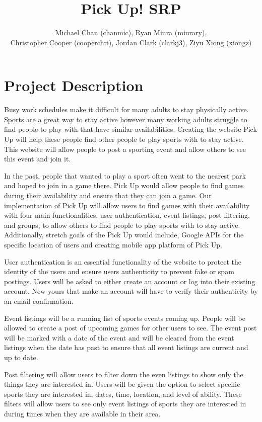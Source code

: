 \documentclass[a4paper]{article}
\title{Pick Up! SRP}
\author{Michael Chan (chanmic), Ryan Miura (miurary), \\Christopher Cooper (cooperchri), Jordan Clark (clarkj3), Ziyu Xiong (xiongz)}
\begin{document}
\maketitle

\section{Project Description}
Busy work schedules make it difficult for many adults to stay physically active. Sports are a great way to stay active however many working adults struggle to find people to play with that have similar availabilities. Creating the website Pick Up will help these people find other people to play sports with to stay active.  This website will allow people to post a sporting event and allow others to see this event and join it.

In the past, people that wanted to play a sport often went to the nearest park and hoped to join in a game there. Pick Up would allow people to find games during their availability and ensure that they can join a game.  Our implementation of Pick Up will allow users to find games with their availability with four main functionalities, user authentication, event listings, post filtering, and groups, to allow others to find people to play sports with to stay active. Additionally, stretch goals of the Pick Up would include, Google APIs for the specific location of users and creating mobile app platform of Pick Up.

User authentication is an essential functionality of the website to protect the identity of the users and ensure users authenticity to prevent fake or spam postings. Users will be asked to either create an account or log into their existing account. New yours that make an account will have to verify their authenticity by an email confirmation.

Event listings will be a running list of sports events coming up. People will be allowed to create a post of upcoming games for other users to see. The event post will be marked with a date of the event and will be cleared from the event listings when the date has past to ensure that all event listings are current and up to date.

Post filtering will allow users to filter down the even listings to show only the things they are interested in. Users will be given the option to select specific sports they are interested in, dates, time, location, and level of ability. These filters will allow users to see only event listings of sports they are interested in during times when they are available in their area.
\end{document}
